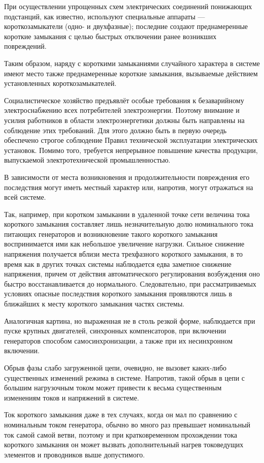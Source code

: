 При осуществлении упрощенных схем электрических соединений понижающих подстанций, как известно, используют специальные аппараты --- короткозамыкатели (одно- и двухфазные); последние создают преднамеренные короткие замыкания с целью быстрых отключении ранее возникших повреждений.

Таким образом, наряду с короткими замыканиями случайного характера в системе имеют место также преднамеренные короткие замыкания, вызываемые действием установленных короткозамыкателей.

Социалистическое хозяйство предъявлёт особые требования к безаварийному электроснабжению всех потребителей электроэнергии. Поэтому внимание и усилия работников в области электроэнергетики должны быть направлены на соблюдение этих требований. Для этого должно быть в первую очередь обеспечено строгое соблюдение Правил технической эксплуатации электрических установок. Помимо того, требуется непрерывное повышение качества продукции, выпускаемой электротехнической промышленностью.

В зависимости от места возникновения и продолжительности повреждения его последствия могут иметь местный характер или, напротив, могут отражаться на всей системе.

Так, например, при коротком замыкании в удаленной точке сети величина тока короткого замыкания составляет лишь незначительную долю номинального тока питающих генераторов и возникновение такого короткого замыкания воспринимается ими как небольшое увеличение нагрузки. Сильное снижение напряжения получается вблизи места трехфазного короткого замыкания, в то время как в других точках системы наблюдается едва заметное снижение напряжения, причем от действия автоматического регулирования возбуждения оно быстро восстанавливается до нормального. Следовательно, при рассматриваемых условиях опасные последствия короткого замыкания проявляются лишь в ближайших к месту короткого замыкания частях системы.

Аналогичная картина, но выраженная не в столь резкой форме, наблюдается при пуске крупных двигателей, синхронных компенсаторов, при включении генераторов способом самосинхронизации, а также при их несинхронном включении.

Обрыв фазы слабо загруженной цепи, очевидно, не вызовет каких-либо существенных изменений режима в системе. Напротив, такой обрыв в цепи с большим нагрузочным током может привести к весьма существенным изменениям токов и напряжений в системе.

Ток короткого замыкания даже в тех случаях, когда он мал по сравнению с номинальным током генератора, обычно во много раз превышает номинальный ток самой самой ветви, поэтому и при кратковременном прохождении тока короткого замыкания он может вызвать дополнительный нагрев токоведущих элементов и проводников выше допустимого.

